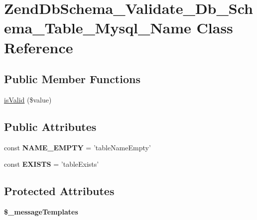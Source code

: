 \hypertarget{classZendDbSchema__Validate__Db__Schema__Table__Mysql__Name}{\section{\-Zend\-Db\-Schema\-\_\-\-Validate\-\_\-\-Db\-\_\-\-Schema\-\_\-\-Table\-\_\-\-Mysql\-\_\-\-Name \-Class \-Reference}
\label{classZendDbSchema__Validate__Db__Schema__Table__Mysql__Name}
}
\subsection*{\-Public \-Member \-Functions}
\begin{DoxyCompactItemize}
\item 
\hyperlink{classZendDbSchema__Validate__Db__Schema__Table__Mysql__Name_aa1f67748b36f1c15e81aabf5a194f447}{is\-Valid} (\$value)
\end{DoxyCompactItemize}
\subsection*{\-Public \-Attributes}
\begin{DoxyCompactItemize}
\item 
\hypertarget{classZendDbSchema__Validate__Db__Schema__Table__Mysql__Name_aeb86e71d6bfd7a10ef0c49752d967777}{const {\bfseries \-N\-A\-M\-E\-\_\-\-E\-M\-P\-T\-Y} = 'table\-Name\-Empty'}\label{classZendDbSchema__Validate__Db__Schema__Table__Mysql__Name_aeb86e71d6bfd7a10ef0c49752d967777}

\item 
\hypertarget{classZendDbSchema__Validate__Db__Schema__Table__Mysql__Name_ac4fc2b263af1004687aaf80af0618ae7}{const {\bfseries \-E\-X\-I\-S\-T\-S} = 'table\-Exists'}\label{classZendDbSchema__Validate__Db__Schema__Table__Mysql__Name_ac4fc2b263af1004687aaf80af0618ae7}

\end{DoxyCompactItemize}
\subsection*{\-Protected \-Attributes}
\begin{DoxyCompactItemize}
\item 
{\bfseries \$\-\_\-message\-Templates}
\end{DoxyCompactItemize}


